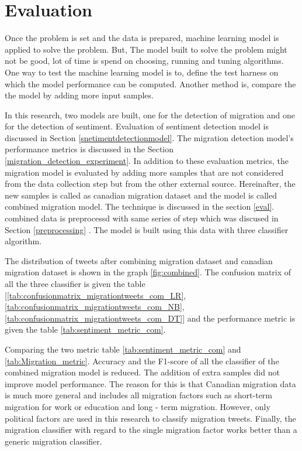 \chapter{Evaluation}\label{chap:evaluation}
Once the problem is set and the data is prepared,  machine learning model is applied to solve the problem. But, The model built to solve the problem might not be good, lot of time is spend on choosing, running and tuning algorithms. One way to test the machine learning model is to, define the test harness on which the model performance can be computed. Another method is, compare the the model by adding more input samples. 

In this research, two models are built, one for the detection of migration and one for the detection of sentiment. Evaluation of sentiment detection model is discussed in Section \ref{snetimentdetectionmodel}. The migration detection model's performance metrics is discussed in the Section \ref{migration_detection_experiment}. In addition to these evaluation metrics, the migration model is evaluated by adding more samples that are not considered from the data collection step but from the other external source. Hereinafter, the new samples is called as canadian migration dataset and the model is called combined migration model. The technique is discussed in the section \ref{eval}. combined data is preprocessd with same series of step which was discused in Section \ref{preprocessing} . The model is built using this data with three classifier algorithm. 

The distribution of tweets after combining migration dataset and canadian migration dataset is shown in the graph \ref{fig:combined}. The confusion matrix of all the three classifier is given the table [\ref{tab:confusionmatrix_migrationtweets_com_LR},\ref{tab:confusionmatrix_migrationtweets_com_NB},\ref{tab:confusionmatrix_migrationtweets_com_DT}] and the performance metric is given the table \ref{tab:sentiment_metric_com}.

Comparing the two metric table  \ref{tab:sentiment_metric_com} and \ref{tab:Migration_metric}. Accuracy and the F1-score of all the classifier of the combined migration model is reduced. The addition of extra samples did not improve model performance. The reason for this is that Canadian migration data is much more general and includes all migration factors such as short-term migration for work or education and long - term migration. However, only political factors are used in this research to classify migration tweets. Finally, the migration classifier with regard to the single migration factor works better than a generic migration classifier.


